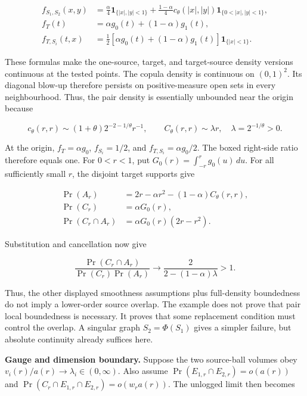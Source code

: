 \documentclass[
  11pt,
  a4paper,
]{article}
\begin{document}
\[
\begin{aligned}
f_{S_1,S_2}(x,y)
&=\tfrac{\alpha}{4}\mathbf 1_{\{|x|,|y|<1\}}
+\tfrac{1-\alpha}{4}c_\theta(|x|,|y|)
\mathbf 1_{\{0<|x|,|y|<1\}},\\
f_T(t)&=\alpha g_0(t)+(1-\alpha)g_1(t),\\
f_{T,S_i}(t,x)&=\tfrac12[\alpha g_0(t)+(1-\alpha)g_1(t)]
\mathbf 1_{\{|x|<1\}}.
\end{aligned}
\]

These formulas make the one-source, target, and target-source density
versions continuous at the tested points. The copula density is
continuous on \((0,1)^2\). Its diagonal blow-up therefore persists on
positive-measure open sets in every neighbourhood. Thus, the pair
density is essentially unbounded near the origin because

\[
c_\theta(r,r)\sim(1+\theta)2^{-2-1/\theta}r^{-1},\qquad
C_\theta(r,r)\sim\lambda r,\quad \lambda=2^{-1/\theta}>0.
\]

At the origin, \(f_T=\alpha g_0\), \(f_{S_i}=1/2\), and
\(f_{T,S_i}=\alpha g_0/2\). The boxed right-side ratio therefore equals
one. For \(0<r<1\), put \(G_0(r)=\int_{-r}^{r}g_0(u)\,du\). For all
sufficiently small \(r\), the disjoint target supports give

\[
\begin{aligned}
\Pr(A_r)&=2r-\alpha r^2-(1-\alpha)C_\theta(r,r),\\
\Pr(C_r)&=\alpha G_0(r),\\
\Pr(C_r\cap A_r)&=\alpha G_0(r)(2r-r^2).
\end{aligned}
\]

Substitution and cancellation now give

\[
\frac{\Pr(C_r\cap A_r)}{\Pr(C_r)\Pr(A_r)}
\longrightarrow \frac{2}{2-(1-\alpha)\lambda}>1.
\]

Thus, the other displayed smoothness assumptions plus full-density
boundedness do not imply a lower-order source overlap. The example does
not prove that pair local boundedness is necessary. It proves that some
replacement condition must control the overlap. A singular graph
\(S_2=\Phi(S_1)\) gives a simpler failure, but absolute continuity
already suffices here.


\textbf{Gauge and dimension boundary.} Suppose the two source-ball
volumes obey \(v_i(r)/a(r)\to\lambda_i\in(0,\infty)\). Also assume
\(\Pr(E_{1,r}\cap E_{2,r})=o(a(r))\) and
\(\Pr(C_r\cap E_{1,r}\cap E_{2,r})=o(w_r a(r))\). The unlogged limit
then becomes
\end{document}
